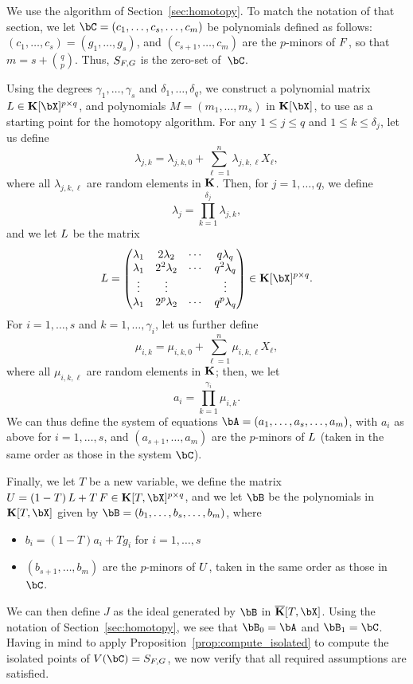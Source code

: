 \documentclass[12pt]{article}
\begin{document}
\medskip

We use the algorithm of Section~\ref{sec:homotopy}. To match the
notation of that section, we let $\bC=(c_1,\dots,c_{s},\dots,c_m)$ be
polynomials defined as follows: $(c_1,\dots,c_{s})=(g_1,\dots,g_s)$,
and $(c_{s+1},\dots,c_{m})$ are the $p$-minors of ${F}$, so that 
$m=s+{q \choose p}$. Thus, $S_{{F},G}$ is the zero-set of~$\bC$.

Using the degrees $\gamma_1,\dots,\gamma_s$ and  $\delta_1,\dots,\delta_q$, we construct a polynomial matrix $\mL \in
\KK[\bX]^{p \times q}$, and polynomials $M=(m_1,\dots,m_s)$ in
$\KK[\bX]$, to use as a starting point for the homotopy
algorithm. For any $1 \leq j \leq q$ and $1 \leq k \leq \delta_j$, let us
define $$\lambda_{j,k} = \lambda_{j,k,0} + \sum_{\ell = 1}^{n}\lambda_{j,k,\ell}X_\ell,$$ 
where all $\lambda_{j,k,\ell}$ are random elements in
$\mathbf{K}$. Then, for $j=1,\dots,q$, we define
$$\lambda_j = \prod_{k=1}^{\delta_j}\lambda_{j,k},$$
and we let  ${L}$ be the matrix
\begin{align}\label{eqdef:col}
\mL = 
\left( \begin{matrix}
\lambda_1 & 2\lambda_2 & \cdots & q\lambda_{q}\\
\lambda_1 & 2^2\lambda_2 & \cdots & q^2\lambda_q\\
\vdots & \vdots &  & \vdots \\
\lambda_1 & 2^p\lambda_2 & \cdots & q^p\lambda_q
\end{matrix} \right) \in \KK[\bX]^{p\times q}.
\end{align}
For $i=1,\dots,s$ and $k=1,\dots,\gamma_i$, let us further define
$$\mu_{i,k} =  \mu_{i,k,0} + \sum_{\ell = 1}^{n}\mu_{i,k,\ell}X_\ell,$$ where
all $\mu_{i,k,\ell}$ are random elements in $\mathbf{K}$; then, we let
$$a_i=\prod_{k=1}^{\gamma_i} \mu_{i,k}.$$ We can thus define the
system of equations $\bA=(a_1,\dots,a_s,\dots,a_m)$, with $a_i$ as
above for $i=1,\dots,s$, and $(a_{s+1},\dots,a_{m})$ are the
$p$-minors of ${L}$ (taken in the same order as those in the system
$\bC$).

Finally, we let $T$ be a new variable, we define the matrix
$\mU=(1-T)\, \mL + T \, \mF \in \KK[T,\bX]^{p\times q}$, and we let $\bB$ be the polynomials in
$\KK[T,\bX]$ given by $\bB=(b_1,\dots,b_s,\dots,b_m)$, where
\begin{itemize}
\item $b_i=(1-T) a_i + T g_i$ for $i=1,\dots,s$
\item $(b_{s+1},\dots,b_{m})$ are the $p$-minors of ${U}$, taken in
  the same order as those in $\bC$.
\end{itemize}
We can then define $J$ as the ideal generated by $\bB$ in
$\KKbar[T,\bX]$. Using the notation of Section~\ref{sec:homotopy}, we
see that $\bB_0=\bA$ and $\bB_1=\bC$. Having in mind
to apply Proposition~\ref{prop:compute_isolated} to compute the
isolated points of $V(\bC)=S_{\mF,\mG}$, we now verify that all
required assumptions are satisfied.
\end{document}
